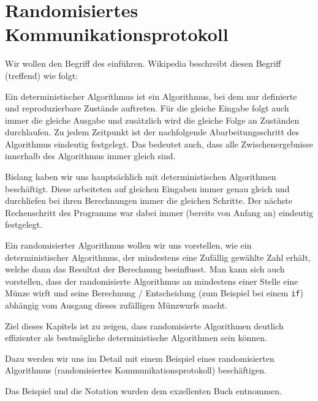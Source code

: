 \chapter{Randomisiertes Kommunikationsprotokoll}
Wir wollen den Begriff des  einführen. Wikipedia beschreibt diesen Begriff (treffend) wie folgt:

\begin{mydefinition}
Ein deterministischer Algorithmus ist ein Algorithmus, bei dem nur definierte und reproduzierbare Zustände auftreten.
Für die gleiche Eingabe folgt auch immer die gleiche Ausgabe und zusätzlich wird die gleiche Folge an Zuständen durchlaufen.
Zu jedem Zeitpunkt ist der nachfolgende Abarbeitungsschritt des Algorithmus eindeutig festgelegt.
Das bedeutet auch, dass alle Zwischenergebnisse innerhalb des Algorithmus immer gleich sind.
\end{mydefinition}

Bislang haben wir uns hauptsächlich mit deterministischen Algorithmen beschäftigt. Diese arbeiteten auf gleichen Eingaben immer genau gleich und durchliefen bei ihren Berechnungen immer die gleichen Schritte. Der nächste Rechenschritt des Programms war dabei immer (bereits von Anfang an) eindeutig festgelegt.

Ein randomisierter Algorithmus wollen wir uns vorstellen, wie ein deterministischer Algorithmus, der mindestens eine Zufällig gewählte Zahl erhält, welche dann das Resultat der Berechnung beeinflusst.
Man kann sich auch vorstellen, dass der randomisierte Algorithmus an mindestens einer Stelle eine Münze wirft und seine Berechnung / Entscheidung (zum Beispiel bei einem \lstinline|if|) abhängig vom Ausgang dieses zufälligen Münzwurfs macht.

Ziel dieses Kapitels ist zu zeigen, dass randomisierte Algorithmen deutlich effizienter als bestmögliche deterministische Algorithmen sein können.

Dazu werden wir uns im Detail mit einem Beispiel eines randomisierten Algorithmus (randomisiertes Kommunikationsprotokoll) beschäftigen.

Das Beispiel und die Notation wurden dem exzellenten Buch \cite{TheoretischeInformatik} entnommen.

